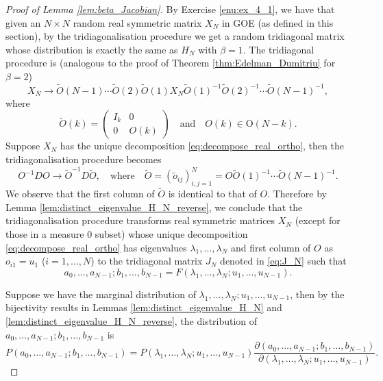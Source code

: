 \documentclass[11pt, a4paper]{article}
\numberwithin{equation}{section}
\newcommand{\Orthogonal}{\mathrm{O}}
\theoremstyle{definition}
\theoremstyle{remark}
\begin{document}
\begin{proof}[Proof of Lemma \ref{lem:beta_Jacobian}]
  By Exercise \ref{enu:ex_4_1}, we have that given an $N \times N$ random real symmetric matrix $X_N$ in GOE (as defined in this section), by the tridiagonalisation procedure we get a random tridiagonal matrix whose distribution is exactly the same as $H_N$ with $\beta = 1$. The tridiagonal procedure is (analogous to the proof of Theorem \ref{thm:Edelman_Dumitriu} for $\beta = 2$)
  \begin{equation}
    X_N \to \tilde{O}(N - 1) \dotsm \tilde{O}(2) \tilde{O}(1) X_N \tilde{O}(1)^{-1} \tilde{O}(2)^{-1} \dotsm \tilde{O}(N - 1)^{-1},
  \end{equation}
  where
  \begin{equation}
    \tilde{O}(k) =
    \begin{pmatrix}
      I_k & 0 \\
      0 & O(k)
    \end{pmatrix}
    \quad \text{and} \quad O(k) \in \Orthogonal(N - k).
  \end{equation}
  Suppose $X_N$ has the unique decomposition \eqref{eq:decompose_real_ortho}, then the tridiagonalisation procedure becomes
  \begin{equation}
    O^{-1} D O \to \tilde{O}^{-1} D \tilde{O}, \quad \text{where} \quad \tilde{O} = (\tilde{o}_{ij})^N_{i, j = 1} = O \tilde{O}(1)^{-1} \dotsm \tilde{O}(N - 1)^{-1}.
  \end{equation}
  We observe that the first column of $\tilde{O}$ is identical to that of $O$. Therefore by Lemma \ref{lem:distinct_eigenvalue_H_N_reverse}, we conclude that the tridiagonalisation procedure transforms real symmetric matrices $X_N$ (except for those in a measure $0$ subset) whose unique decomposition \eqref{eq:decompose_real_ortho} has eigenvalues $\lambda_1, \dotsc, \lambda_N$ and first column of $O$ as $o_{i1} = u_1$ ($i = 1, \dotsc, N$) to the tridiagonal matrix $J_N$ denoted in \eqref{eq:J_N} such that
  \begin{equation}
    a_0, \dotsc, a_{N - 1}; b_1, \dotsc, b_{N - 1} = F(\lambda_1, \dotsc, \lambda_N; u_1, \dotsc, u_{N - 1}).
  \end{equation}

  Suppose we have the marginal distribution of $\lambda_1, \dotsc, \lambda_N; u_1, \dotsc, u_{N - 1}$, then by the bijectivity results in Lemmas \ref{lem:distinct_eigenvalue_H_N} and \ref{lem:distinct_eigenvalue_H_N_reverse}, the distribution of $a_0, \dotsc, a_{N - 1}; b_1, \dotsc, b_{N - 1}$ is
  \begin{equation} \label{eq:relation_of_marginal_pdf}
    P(a_0, \dotsc, a_{N - 1}; b_1, \dotsc, b_{N - 1}) = P(\lambda_1, \dotsc, \lambda_N; u_1, \dotsc, u_{N - 1}) \frac{\partial(a_0, \dotsc, a_{N - 1}; b_1, \dotsc, b_{N - 1})}{\partial(\lambda_1, \dotsc, \lambda_N; u_1, \dotsc, u_{N - 1})}.
  \end{equation}


\end{proof}
\end{document}
